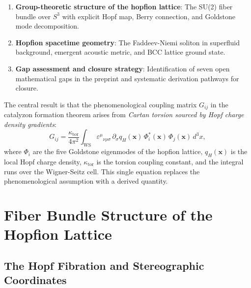 \documentclass[11pt,letterpaper]{article}
\begin{document}
\begin{enumerate}[label=(\roman*)]
    \item \textbf{Group-theoretic structure of the hopfion lattice}: The SU(2) fiber bundle over $S^3$ with explicit Hopf map, Berry connection, and Goldstone mode decomposition.
    \item \textbf{Hopfion spacetime geometry}: The Faddeev-Niemi soliton in superfluid background, emergent acoustic metric, and BCC lattice ground state.
    \item \textbf{Gap assessment and closure strategy}: Identification of seven open mathematical gaps in the preprint and systematic derivation pathways for closure.
\end{enumerate}

The central result is that the phenomenological coupling matrix $G_{ij}$ in the catalyzon formation theorem arises from \textit{Cartan torsion sourced by Hopf charge density gradients}:
\begin{equation}
\boxed{G_{ij} = \frac{\kappa_{\text{tor}}}{4\pi^2} \int_{\text{WS}} \varepsilon^{\mu}{}_{\nu\rho\sigma}\, \partial_\sigma q_H(\mathbf{x})\, \Phi_i^*(\mathbf{x})\, \Phi_j(\mathbf{x})\, d^3x,}
\label{eq:Gij_torsion}
\end{equation}
where $\Phi_i$ are the five Goldstone eigenmodes of the hopfion lattice, $q_H(\mathbf{x})$ is the local Hopf charge density, $\kappa_{\text{tor}}$ is the torsion coupling constant, and the integral runs over the Wigner-Seitz cell. This single equation replaces the phenomenological assumption with a derived quantity.

\section{Fiber Bundle Structure of the Hopfion Lattice}
\label{sec:fiber_bundle}

\subsection{The Hopf Fibration and Stereographic Coordinates}
\end{document}
